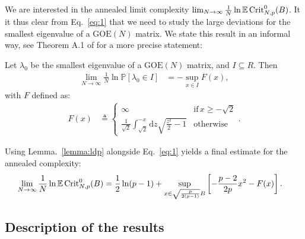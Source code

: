 \documentclass[amsmath,amssymb,nofootinbib,prd]{article}
\begin{document}
		
	We are interested in the annealed limit complexity	$\lim_{N \to \infty} \frac{1}{N} \ln \mathbb{E} \, \mathrm{Crit}_{N,p}^0(B)$. It it thus clear from Eq.~\ref{eq:1} that we need to study the large deviations for the smallest eigenvalue of a $\mathrm{GOE}(N)$ matrix. We state this result in an informal way, see Theorem A.1 of \cite{auffinger2013random} for a more precise statement:
\begin{lemma}[Informal]\label{lemma:ldp}
Let $\lambda_0$ be the smallest eigenvalue of a $\mathrm{GOE}(N)$ matrix, and $I \subseteq R$. Then
\begin{align}
\lim_{N \to \infty} \frac{1}{N} \ln \mathbb{P}\left[\lambda_0 \in I\right] &= - \sup_{x \in I} F(x),
\end{align}
with $F$ defined as:
\begin{align}
F(x) &\triangleq \begin{cases} \infty &\mathrm{if}\,x \geq -\sqrt{2}  \\
 \frac{1}{\sqrt{2}} \int_{\sqrt{2}}^{-x} \mathrm{d}z\sqrt{\frac{z^2}{2} -1} & \mathrm{otherwise}
\end{cases}.
\end{align}
\end{lemma}
Using Lemma.~\ref{lemma:ldp} alongside Eq.~\ref{eq:1} yields a final estimate for the annealed complexity:
\begin{align}\label{eq:2}
\lim_{N \to \infty} \frac{1}{N} \ln \mathbb{E} \, \mathrm{Crit}_{N,p}^0(B) &= \frac{1}{2} \ln (p-1) + \sup_{x \in \sqrt{\frac{p}{2(p-1)}} B} \left[-\frac{p-2}{2p}x^2 - F(x)\right].
\end{align}
	
	\subsection{Description of the results}\label{subsec:summary}
	
\end{document}
